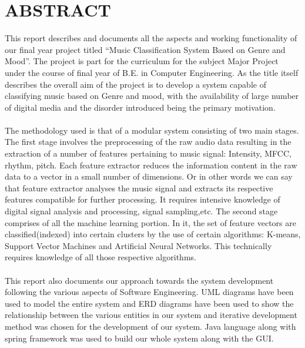 \newpage
\section*{ABSTRACT}

This report describes and documents all the aspects and working functionality of our final year project titled “Music Classification System
Based on Genre and Mood”. The project is part for the curriculum for the subject Major Project under the course of final year of B.E. in Computer Engineering.
As the title itself describes the overall aim of the project is to develop a system capable of classifying music based on Genre and mood, with the availability of large
number of digital media and the disorder introduced being the primary motivation.\\  
\\
The methodology used is that of a modular system consisting of two main stages. The first stage involves the preprocessing of the raw audio
data resulting in the extraction of a number of features pertaining to music signal: Intensity, MFCC, rhythm, pitch. Each feature extractor
reduces the information content in the raw data to a vector in a small number of dimensions. Or in other words we can say that feature extractor 
analyses the music signal and extracts its respective features compatible for further processing. It requires intensive knowledge of digital signal
analysis and processing, signal sampling,etc. The second stage comprises of all the machine learning portion. In it, the set of feature vectors are classified(indexed) into certain clusters
by the use of certain algorithms: K-means, Support Vector Machines and  Artificial Neural Networks. This technically requires knowledge of all those respective algorithms.\\ 
\\
This report also documents our approach towards the system development following the various aspects of Software Engineering. UML diagrams have been
used to model the entire system and ERD diagrams have been used to show the relationship between the various entities in our system and iterative 
development method was chosen for the development of our system. Java language along with spring framework was used to build our whole system along
with the GUI.\\


